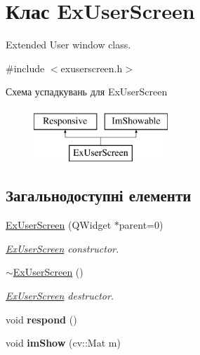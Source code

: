 \hypertarget{classExUserScreen}{\section{Клас Ex\-User\-Screen}
\label{classExUserScreen}
}


Extended User window class.  




{\ttfamily \#include $<$exuserscreen.\-h$>$}

Схема успадкувань для Ex\-User\-Screen\begin{figure}[H]
\begin{center}
\leavevmode
\includegraphics[height=2.000000cm]{classExUserScreen}
\end{center}
\end{figure}
\subsection*{Загальнодоступні елементи}
\begin{DoxyCompactItemize}
\item 
\hyperlink{classExUserScreen_a8642db4f09c4528daf7e22ce2dcc1b47}{Ex\-User\-Screen} (Q\-Widget $\ast$parent=0)
\begin{DoxyCompactList}\small\item\em \hyperlink{classExUserScreen}{Ex\-User\-Screen} constructor. \end{DoxyCompactList}\item 
\hypertarget{classExUserScreen_a61421cd56bb9b54501c4cb34d297891f}{\hyperlink{classExUserScreen_a61421cd56bb9b54501c4cb34d297891f}{$\sim$\-Ex\-User\-Screen} ()}\label{classExUserScreen_a61421cd56bb9b54501c4cb34d297891f}

\begin{DoxyCompactList}\small\item\em \hyperlink{classExUserScreen}{Ex\-User\-Screen} destructor. \end{DoxyCompactList}\item 
\hypertarget{classExUserScreen_a02023bde7f3823dbeb460fddcef8341e}{void {\bfseries respond} ()}\label{classExUserScreen_a02023bde7f3823dbeb460fddcef8341e}

\item 
\hypertarget{classExUserScreen_ad479165ffd920e5ef152e5aff1ed4d6b}{void {\bfseries im\-Show} (cv\-::\-Mat m)}\label{classExUserScreen_ad479165ffd920e5ef152e5aff1ed4d6b}

\end{DoxyCompactItemize}
